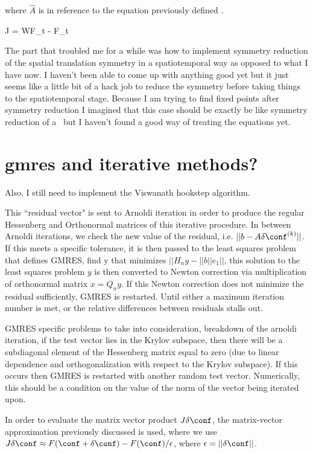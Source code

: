 where $\hat{A}$ is in reference to the equation previously defined .

\beq
J = W\cdot F_t - F_t\cdot {}
\eeq

The part that troubled me for a while was how to implement symmetry reduction of the spatial translation
symmetry in a spatiotemporal way as opposed to what I have now. I haven't been able to come
up with anything good yet but it just seems like a little bit of a hack job to reduce
the symmetry before taking things to the spatiotemporal stage. Because I am trying
to find fixed points after symmetry reduction I imagined that this case should be
exactly be like symmetry reduction of a \reqva\ but I haven't found a good way of treating
the equations yet.

\section{gmres and iterative methods?}

Also, I still need to implement the Viswanath hookstep algorithm.

This ``residual vector" is sent to Arnoldi iteration in order to produce the
regular Hessenberg and Orthonormal matrices of this iterative procedure. In
between Arnoldi iterations, we check the new value of the residual, i.e.
$||b-A\delta\conf^{(k)}||$. If this meets a specific tolerance, it is then
passed to the least squares problem that defines GMRES, find
y that minimizes $||H_n y - ||b|| e_1||$, this solution to the least squares
problem $y$ is then converted to Newton correction via multiplication of
orthonormal matrix $x = Q_n y$. If this Newton correction does not minimize
the residual sufficiently, GMRES is restarted. Until either a maximum
iteration number is met, or the relative differences between residuals stalls
out.

GMRES specific problems to take into consideration,
breakdown of the arnoldi iteration, if the test vector lies in the Krylov subspace,
then there will be a subdiagonal element of the
 Hessenberg matrix equal to zero (due to linear
  dependence and orthogonalization with
respect to the Krylov subspace). If this occurs then
 GMRES is restarted with another random test vector.
Numerically, this should be a condition on the value of the norm
of the vector being iterated upon.

In order to evaluate the matrix vector product $J \delta \conf$, the matrix-vector approximation previously discussed is used, where
we use $J\delta \conf \approx F(\conf +\delta \conf) - F(\conf) / \epsilon$, where $\epsilon = ||\delta \conf||$.

